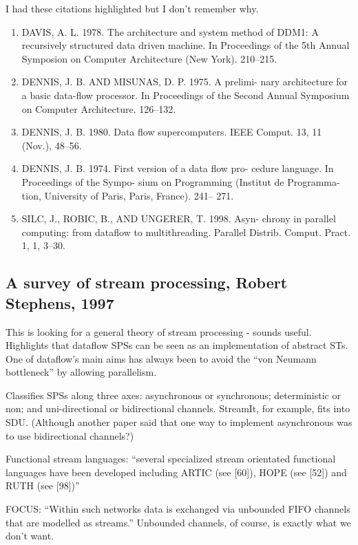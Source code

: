I had these citations highlighted but I don't remember why.
\begin{enumerate}
\item
DAVIS, A. L. 1978. The architecture and system method of DDM1: A recursively structured data driven machine. In Proceedings of the 5th Annual Symposion on Computer Architecture (New York). 210–215.

\item
DENNIS, J. B. AND MISUNAS, D. P. 1975. A prelimi- nary architecture for a basic data-flow processor. In Proceedings of the Second Annual Symposium on Computer Architecture. 126–132.

\item
DENNIS, J. B. 1980. Data flow supercomputers. IEEE Comput. 13, 11 (Nov.), 48–56.

\item
DENNIS, J. B. 1974. First version of a data flow pro- cedure language. In Proceedings of the Sympo- sium on Programming (Institut de Programma- tion, University of Paris, Paris, France). 241– 271.

\item
SILC, J., ROBIC, B., AND UNGERER, T. 1998. Asyn- chrony in parallel computing: from dataflow to multithreading. Parallel Distrib. Comput. Pract. 1, 1, 3–30.
\end{enumerate}

\subsection{A survey of stream processing, Robert Stephens, 1997}
This is looking for a general theory of stream processing - sounds useful\cite{stephens1997survey}.
Highlights that dataflow SPSs can be seen as an implementation of abstract STs.
One of dataflow's main aims has always been to avoid the ``von Neumann bottleneck'' by allowing parallelism.

Classifies SPSs along three axes: asynchronous or synchronous; deterministic or non; and uni-directional or bidirectional channels. StreamIt, for example, fits into SDU.
(Although another paper said that one way to implement asynchronous was to use bidirectional channels?)

Functional stream languages:
``several specialized stream orientated functional languages have been developed including ARTIC (see [60]), HOPE (see [52]) and RUTH (see [98])''

FOCUS: ``Within such networks data is exchanged via unbounded FIFO channels that are modelled as streams.''
Unbounded channels, of course, is exactly what we don't want.


